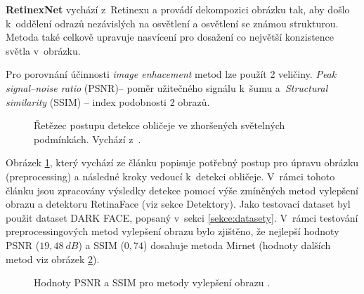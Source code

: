 \textbf{RetinexNet} vychází z~Retinexu a provádí dekompozici obrázku tak, aby došlo k~oddělení odrazů nezávislých na osvětlení a osvětlení se známou strukturou. Metoda také celkově upravuje nasvícení pro dosažení co největší konzistence světla v~obrázku.

Pro porovnání účinnosti \emph{image enhacement} metod lze použít 2 veličiny. \emph{Peak signal--noise ratio} (PSNR)-- poměr užitečného signálu k~šumu a~\emph{Structural similarity} (SSIM) -- index podobnosti 2 obrazů.

\begin{figure}[H]
  \begin{center}
  \label{obrazek:iepostup}
  \caption{Řetězec postupu detekce obličeje ve zhoršených světelných podmínkách. Vychází z~\cite{lowLightFdReview}.}
  \end{center}
\end{figure}

Obrázek \ref{obrazek:iepostup}, který vychází ze článku \cite{lowLightFdReview} popisuje potřebný postup pro úpravu obrázku (preprocessing) a následné kroky vedoucí k~detekci obličeje. V~rámci tohoto článku jsou zpracovány výsledky detekce pomocí výše zmíněných metod vylepšení obrazu a detektoru RetinaFace (viz sekce Detektory). Jako testovací dataset byl použit dataset DARK FACE, popsaný v~sekci \ref{sekce:datasety}. V~rámci testování preprocessingových metod vylepšení obrazu bylo zjištěno, že nejlepší hodnoty PSNR ($19,48\:dB$) a SSIM ($0,74$) dosahuje metoda Mirnet (hodnoty dalších metod viz obrázek \ref{obrazek:psnrssim}).

\begin{figure}[H]
  \begin{center}
  \label{obrazek:psnrssim}
  \caption{Hodnoty PSNR a SSIM pro metody vylepšení obrazu \cite{lowLightFdReview}.}
  \end{center}
\end{figure}

